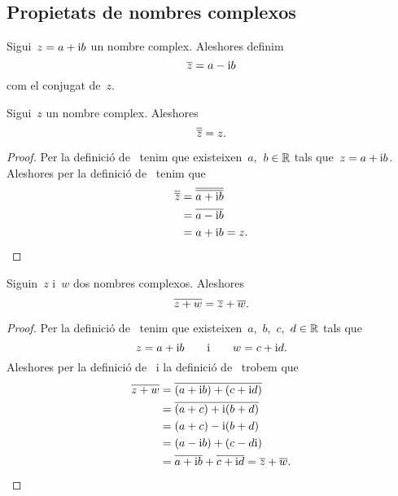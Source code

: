 \documentclass[../Apunts.tex]{subfiles}
\begin{document}
    \subsection{Propietats de nombres complexos}
    \begin{definition}
        \label{def:conjugat d'un nombre complex}
        Sigui~\(z=a+\mathrm{i} b\) un nombre complex.
        Aleshores definim
        \[\overline{z}=a-\mathrm{i} b\]
        com el conjugat de~\(z\).
    \end{definition}
    \begin{proposition}
        \label{prop:el conjugat del conjugat d'un nombre complex és ell mateix}
        Sigui~\(z\) un nombre complex.
        Aleshores
        \[\overline{\overline{z}}=z.\]
    \end{proposition}
    \begin{proof}
        Per la definició de~ tenim que
        existeixen~\(a\),~\(b\in\mathbb{R}\) tals que~\(z=a+\mathrm{i} b\).
        Aleshores per la definició de~
        tenim que
        \begin{align*}
            \overline{\overline{z}}
            &=\overline{\overline{a+\mathrm{i} b}} \\
            &=\overline{a-\mathrm{i} b} \\
            &=a+\mathrm{i} b
            =z.
            \qedhere
        \end{align*}
    \end{proof}
    \begin{proposition}
        \label{prop:el conjugat de la suma és la suma de conjugats}
        Siguin~\(z\) i~\(w\) dos nombres complexos.
        Aleshores
        \[\overline{z+w}=\overline{z}+\overline{w}.\]
    \end{proposition}
    \begin{proof}
        Per la definició de~ tenim que
        existeixen~\(a\),~\(b\),~\(c\),~\(d\in\mathbb{R}\) tals que
        \[z=a+\mathrm{i} b\qquad\text{i}\qquad w=c+\mathrm{i} d.\]
        Aleshores per la definició de~
        i la definició de~ trobem que
        \begin{align*}
            \overline{z+w}
            &=\overline{(a+\mathrm{i} b)+(c+\mathrm{i} d)} \\
            &=\overline{(a+c)+\mathrm{i}(b+d)} \\
            &=(a+c)-\mathrm{i}(b+d) \\
            &=(a-\mathrm{i} b)+(c-d\mathrm{i}) \\
            &=\overline{a+\mathrm{i} b}+\overline{c+\mathrm{i} d}
            =\overline{z}+\overline{w}.
            \qedhere
        \end{align*}
    \end{proof}
\end{document}

